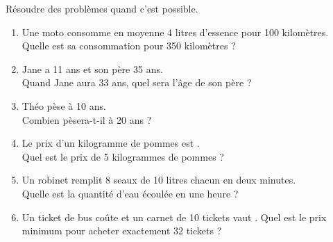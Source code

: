 \exercicesbase

\begin{colonne*exercice}


\begin{exercice}
   Résoudre des problèmes quand c'est possible.
   \begin{enumerate}
      \item Une moto consomme en moyenne 4 litres d'essence pour 100 kilomètres. \\
         Quelle est sa consommation pour 350 kilomètres ?
      \item Jane a 11 ans et son père 35 ans. \\
         Quand Jane aura 33 ans, quel sera l'âge de son père ?
      \item Théo pèse  à 10 ans. \\
         Combien pèsera-t-il à 20 ans ?
      \item Le prix d'un kilogramme de pommes est . \\
         Quel est le prix de 5 kilogrammes de pommes ?
      \item Un robinet remplit 8 seaux de 10 litres chacun en deux minutes. \\
         Quelle est la quantité d'eau écoulée en une heure ?
      \item Un ticket de bus coûte  et un carnet de 10 tickets vaut .
         Quel est le prix minimum pour acheter exactement 32 tickets ?
   \end{enumerate}
\end{exercice}

\medskip


\end{colonne*exercice}
